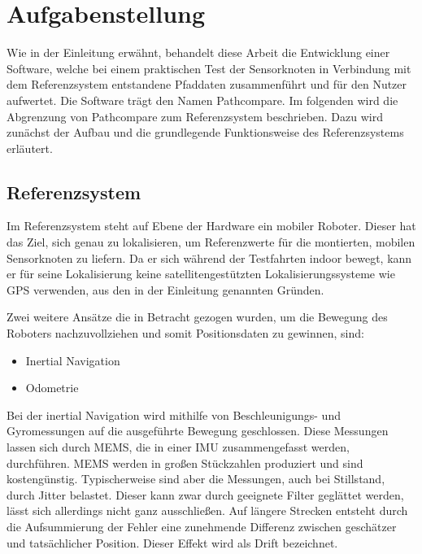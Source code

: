 \section{Aufgabenstellung}
\label{sec:aufgabenstellung}

Wie in der Einleitung erwähnt, behandelt diese Arbeit die Entwicklung einer
Software, welche bei einem praktischen Test der Sensorknoten in Verbindung mit
dem Referenzsystem entstandene Pfaddaten zusammenführt und für den Nutzer
aufwertet. Die Software trägt den Namen Pathcompare.
Im folgenden wird die Abgrenzung von Pathcompare zum 
Referenzsystem beschrieben. Dazu wird zunächst der Aufbau und die grundlegende
Funktionsweise des Referenzsystems erläutert.

\subsection{Referenzsystem}
\label{sub:roboter}

Im Referenzsystem steht auf Ebene der Hardware ein mobiler Roboter. Dieser hat
das Ziel, sich genau zu lokalisieren, um Referenzwerte für die montierten,
mobilen Sensorknoten zu liefern. Da er sich während der Testfahrten indoor
bewegt, kann er für seine Lokalisierung keine satellitengestützten
Lokalisierungssysteme wie GPS verwenden, aus den in der Einleitung genannten
Gründen. 

Zwei weitere Ansätze die in Betracht gezogen wurden, um die Bewegung
des Roboters nachzuvollziehen und somit Positionsdaten zu gewinnen, sind:

\begin{itemize}
  \item Inertial Navigation
  \item Odometrie
\end{itemize}

Bei der inertial Navigation wird mithilfe von Beschleunigungs- und
Gyromessungen auf die ausgeführte Bewegung geschlossen. Diese Messungen lassen
sich durch \gls{MEMS}, die in einer 
\gls{IMU} zusammengefasst werden, durchführen.
\gls{MEMS} werden in großen Stückzahlen produziert und sind kostengünstig.
Typischerweise sind aber die Messungen, auch bei Stillstand, durch Jitter belastet.
Dieser kann zwar durch geeignete Filter geglättet werden, lässt sich allerdings
nicht ganz ausschließen. Auf längere Strecken entsteht durch die Aufsummierung
der Fehler eine zunehmende Differenz zwischen geschätzer und tatsächlicher
Position. Dieser Effekt wird als Drift bezeichnet.

